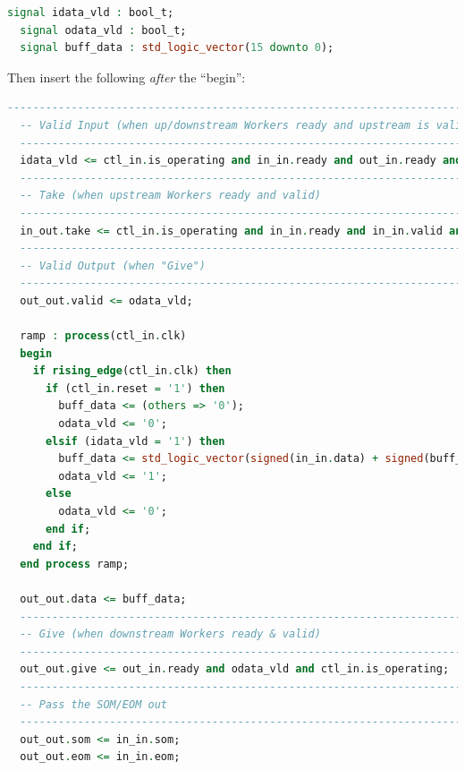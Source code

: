\begin{lstlisting}[language=vhdl]
  signal idata_vld : bool_t;
  signal odata_vld : bool_t;
  signal buff_data : std_logic_vector(15 downto 0);
\end{lstlisting}
\bend
\pagebreak[1]
Then insert the following \textit{after} the ``begin'':
\begin{lstlisting}[language=vhdl]
  -----------------------------------------------------------------------------
  -- Valid Input (when up/downstream Workers ready and upstream is valid
  -----------------------------------------------------------------------------
  idata_vld <= ctl_in.is_operating and in_in.ready and out_in.ready and in_in.valid;
  -----------------------------------------------------------------------------
  -- Take (when upstream Workers ready and valid)
  -----------------------------------------------------------------------------
  in_out.take <= ctl_in.is_operating and in_in.ready and in_in.valid and out_in.ready;
  -----------------------------------------------------------------------------
  -- Valid Output (when "Give")
  -----------------------------------------------------------------------------
  out_out.valid <= odata_vld;

  ramp : process(ctl_in.clk)
  begin
    if rising_edge(ctl_in.clk) then
      if (ctl_in.reset = '1') then
        buff_data <= (others => '0');
        odata_vld <= '0';
      elsif (idata_vld = '1') then
        buff_data <= std_logic_vector(signed(in_in.data) + signed(buff_data));
        odata_vld <= '1';
      else
        odata_vld <= '0';
      end if;
    end if;
  end process ramp;

  out_out.data <= buff_data;
  -----------------------------------------------------------------------------
  -- Give (when downstream Workers ready & valid)
  -----------------------------------------------------------------------------
  out_out.give <= out_in.ready and odata_vld and ctl_in.is_operating;
  -----------------------------------------------------------------------------
  -- Pass the SOM/EOM out
  -----------------------------------------------------------------------------
  out_out.som <= in_in.som;
  out_out.eom <= in_in.eom;
\end{lstlisting}

